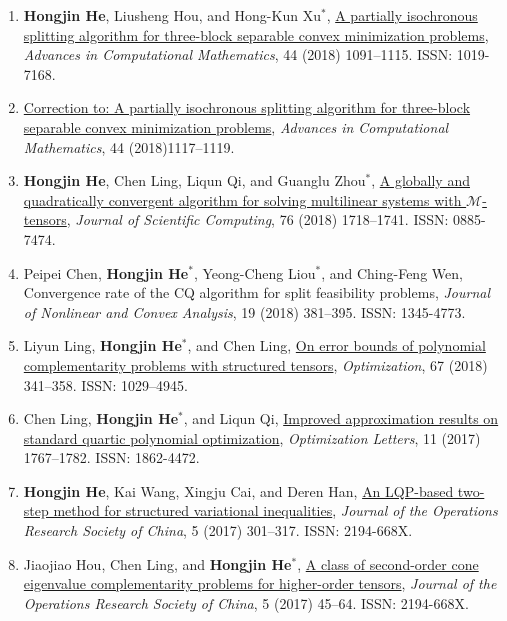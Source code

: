 \begin{enumerate}
\item {\bf\color{black}Hongjin He}, Liusheng Hou, and Hong-Kun Xu$^*$,
\href{http://dx.doi.org/10.1007/s10444-017-9574-4}{\color{blue}A partially isochronous splitting
	algorithm for three-block separable convex minimization problems}, {\it Advances in
	Computational Mathematics}, 44 (2018) 1091--1115. ISSN: 1019-7168.

\item[]  \href{https://doi.org/10.1007/s10444-017-9574-4}{Correction to: A partially
	isochronous splitting algorithm for three-block separable convex minimization problems},
{\it Advances in Computational Mathematics}, 44 (2018)1117--1119.

\item {\bf\color{black}Hongjin He}, Chen Ling, Liqun Qi, and Guanglu Zhou$^*$, \href{https://doi.org/10.1007/s10915-018-0689-7}{\color{blue}A globally and quadratically convergent algorithm for solving multilinear systems with ${\mathcal M}$-tensors}, {\it Journal of Scientific Computing}, 76 (2018) 1718--1741. ISSN: 0885-7474.

\item Peipei Chen, {\bf\color{black}Hongjin He}$^*$, Yeong-Cheng Liou$^*$, and Ching-Feng Wen, Convergence rate of the CQ algorithm for split feasibility problems, {\it Journal of Nonlinear and Convex Analysis}, 19 (2018) 381--395. ISSN: 1345-4773.

\item Liyun Ling, {\bf\color{black}Hongjin He}$^*$, and Chen Ling, \href{http://www.tandfonline.com/doi/full/10.1080/02331934.2017.1391254?scroll=top&needAccess=true}{On error bounds of polynomial complementarity problems with structured tensors}, {\it Optimization}, 67 (2018) 341--358. ISSN: 1029--4945.

\item Chen Ling, {\bf\color{black}Hongjin He}$^*$, and Liqun Qi, \href{http://dx.doi.org/10.1007/s11590-016-1094-5}{Improved approximation results on standard quartic polynomial optimization}, {\it Optimization Letters}, 11 (2017) 1767--1782. ISSN: 1862-4472.

\item {\bf\color{black}Hongjin He}, Kai Wang, Xingju Cai, and Deren Han, \href{http://dx.doi.org/10.1007/s40305-016-0147-x}{An LQP-based two-step method for structured variational inequalities}, {\it Journal of the Operations Research Society of China}, 5 (2017) 301--317. ISSN: 2194-668X.


\item Jiaojiao Hou, Chen Ling, and {\bf\color{black}Hongjin He}$^*$, \href{http://dx.doi.org/10.1007/s40305-016-0137-z}{A class of second-order cone eigenvalue complementarity problems for higher-order tensors}, {\it Journal of the Operations Research Society of China}, 5 (2017) 45--64. ISSN: 2194-668X.


\end{enumerate}
